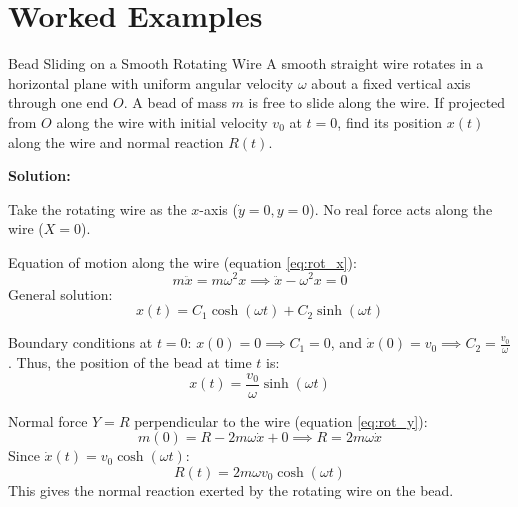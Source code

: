 \section{Worked Examples}

\begin{examplebox}{Bead Sliding on a Smooth Rotating Wire}
A smooth straight wire rotates in a horizontal plane with uniform angular velocity $\omega$ about a fixed vertical axis through one end $O$. A bead of mass $m$ is free to slide along the wire. If projected from $O$ along the wire with initial velocity $v_0$ at $t=0$, find its position $x(t)$ along the wire and normal reaction $R(t)$.

\tcblower
\textbf{Solution:}

Take the rotating wire as the $x$-axis ($\dot{y} = 0, y = 0$).
No real force acts along the wire ($X = 0$).

Equation of motion along the wire (equation \eqref{eq:rot_x}):
\begin{equation*}
    m \ddot{x} = m \omega^2 x \implies \ddot{x} - \omega^2 x = 0
\end{equation*}
General solution:
\begin{equation*}
    x(t) = C_1 \cosh(\omega t) + C_2 \sinh(\omega t)
\end{equation*}

Boundary conditions at $t=0$: $x(0) = 0 \implies C_1 = 0$, and $\dot{x}(0) = v_0 \implies C_2 = \frac{v_0}{\omega}$.
Thus, the position of the bead at time $t$ is:
\begin{equation*}
    x(t) = \frac{v_0}{\omega} \sinh(\omega t)
\end{equation*}

Normal force $Y = R$ perpendicular to the wire (equation \eqref{eq:rot_y}):
\begin{equation*}
    m (0) = R - 2 m \omega \dot{x} + 0 \implies R = 2 m \omega \dot{x}
\end{equation*}
Since $\dot{x}(t) = v_0 \cosh(\omega t)$:
\begin{equation*}
    R(t) = 2 m \omega v_0 \cosh(\omega t)
\end{equation*}
This gives the normal reaction exerted by the rotating wire on the bead.
\end{examplebox}

